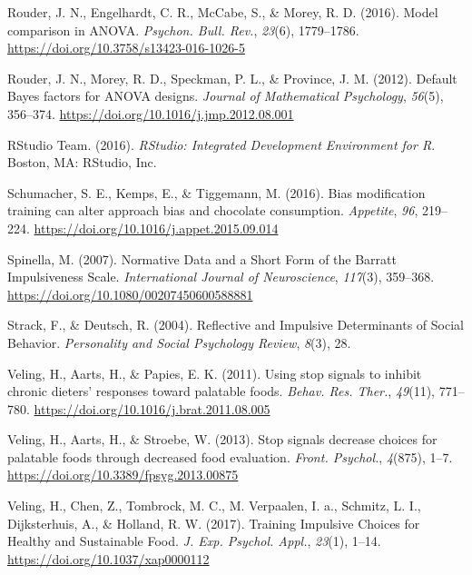\documentclass[man,floatsintext]{apa6}
\begin{document}
\leavevmode\hypertarget{ref-rouderModelComparisonANOVA2016}{}%
Rouder, J. N., Engelhardt, C. R., McCabe, S., \& Morey, R. D. (2016). Model comparison in ANOVA. \emph{Psychon. Bull. Rev.}, \emph{23}(6), 1779--1786. \url{https://doi.org/10.3758/s13423-016-1026-5}

\leavevmode\hypertarget{ref-rouderDefaultBayesFactors2012}{}%
Rouder, J. N., Morey, R. D., Speckman, P. L., \& Province, J. M. (2012). Default Bayes factors for ANOVA designs. \emph{Journal of Mathematical Psychology}, \emph{56}(5), 356--374. \url{https://doi.org/10.1016/j.jmp.2012.08.001}

\leavevmode\hypertarget{ref-rstudio}{}%
RStudio Team. (2016). \emph{RStudio: Integrated Development Environment for R}. Boston, MA: RStudio, Inc.

\leavevmode\hypertarget{ref-schumacher_bias_2016}{}%
Schumacher, S. E., Kemps, E., \& Tiggemann, M. (2016). Bias modification training can alter approach bias and chocolate consumption. \emph{Appetite}, \emph{96}, 219--224. \url{https://doi.org/10.1016/j.appet.2015.09.014}

\leavevmode\hypertarget{ref-spinellaNormativeDataShort2007}{}%
Spinella, M. (2007). Normative Data and a Short Form of the Barratt Impulsiveness Scale. \emph{International Journal of Neuroscience}, \emph{117}(3), 359--368. \url{https://doi.org/10.1080/00207450600588881}

\leavevmode\hypertarget{ref-strack_reflective_2004}{}%
Strack, F., \& Deutsch, R. (2004). Reflective and Impulsive Determinants of Social Behavior. \emph{Personality and Social Psychology Review}, \emph{8}(3), 28.

\leavevmode\hypertarget{ref-veling_using_2011}{}%
Veling, H., Aarts, H., \& Papies, E. K. (2011). Using stop signals to inhibit chronic dieters' responses toward palatable foods. \emph{Behav. Res. Ther.}, \emph{49}(11), 771--780. \url{https://doi.org/10.1016/j.brat.2011.08.005}

\leavevmode\hypertarget{ref-veling_stop_2013}{}%
Veling, H., Aarts, H., \& Stroebe, W. (2013). Stop signals decrease choices for palatable foods through decreased food evaluation. \emph{Front. Psychol.}, \emph{4}(875), 1--7. \url{https://doi.org/10.3389/fpsyg.2013.00875}

\leavevmode\hypertarget{ref-veling_training_2017-1}{}%
Veling, H., Chen, Z., Tombrock, M. C., M. Verpaalen, I. a., Schmitz, L. I., Dijksterhuis, A., \& Holland, R. W. (2017). Training Impulsive Choices for Healthy and Sustainable Food. \emph{J. Exp. Psychol. Appl.}, \emph{23}(1), 1--14. \url{https://doi.org/10.1037/xap0000112}
\end{document}
